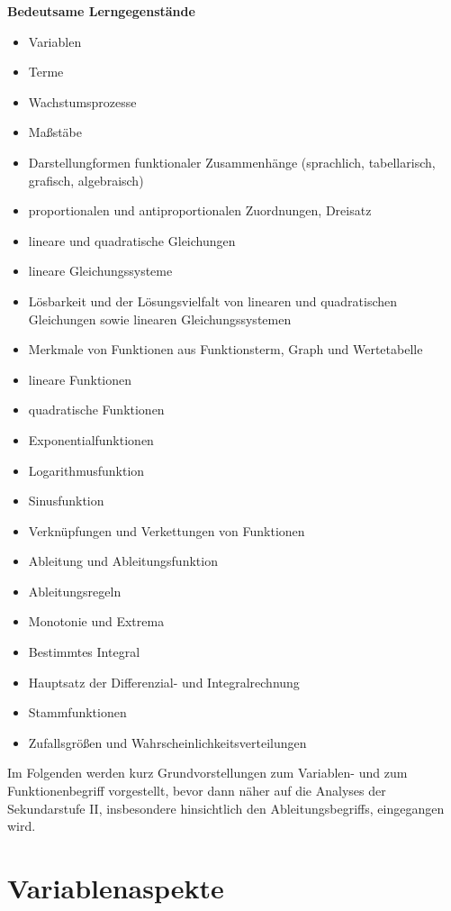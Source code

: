 \documentclass[
]{scrbook}
\providecommand{\tightlist}{%
  \setlength{\itemsep}{0pt}\setlength{\parskip}{0pt}}
\renewenvironment{quote}{
  \list{}{
	\leftmargin0.2cm   %
    \rightmargin\leftmargin
      	\def\FrameCommand
    {%
        {\color{quoteColor}\vrule width 2pt}%
        \hspace{0pt}%
    }%
    \MakeFramed{\advance \hsize -\width \FrameRestore}    \color{quoteColor}
    }
  \item\relax
}
{\endlist\color{black}\endMakeFramed}
\theoremstyle{definition}
\theoremstyle{definition}
\theoremstyle{definition}
\theoremstyle{definition}
\theoremstyle{remark}
\begin{document}
\begin{quote}
\textbf{Bedeutsame Lerngegenstände}

\begin{itemize}
\tightlist
\item
  Variablen
\item
  Terme
\item
  Wachstumsprozesse
\item
  Maßstäbe
\item
  Darstellungformen funktionaler Zusammenhänge (sprachlich, tabellarisch, grafisch, algebraisch)
\item
  proportionalen und antiproportionalen Zuordnungen, Dreisatz
\item
  lineare und quadratische Gleichungen
\item
  lineare Gleichungssysteme
\item
  Lösbarkeit und der Lösungsvielfalt von linearen und quadratischen Gleichungen sowie linearen Gleichungssystemen
\item
  Merkmale von Funktionen aus Funktionsterm, Graph und Wertetabelle
\item
  lineare Funktionen
\item
  quadratische Funktionen
\item
  Exponentialfunktionen
\item
  Logarithmusfunktion
\item
  Sinusfunktion
\item
  Verknüpfungen und Verkettungen von Funktionen
\item
  Ableitung und Ableitungsfunktion
\item
  Ableitungsregeln
\item
  Monotonie und Extrema
\item
  Bestimmtes Integral
\item
  Hauptsatz der Differenzial- und Integralrechnung
\item
  Stammfunktionen
\item
  Zufallsgrößen und Wahrscheinlichkeitsverteilungen
\end{itemize}
\end{quote}

Im Folgenden werden kurz Grundvorstellungen zum Variablen- und zum Funktionenbegriff vorgestellt, bevor dann näher auf die Analyses der Sekundarstufe II, insbesondere hinsichtlich den Ableitungsbegriffs, eingegangen wird.

\hypertarget{variablenaspekte}{%
\section{Variablenaspekte}\label{variablenaspekte}}
\end{document}
